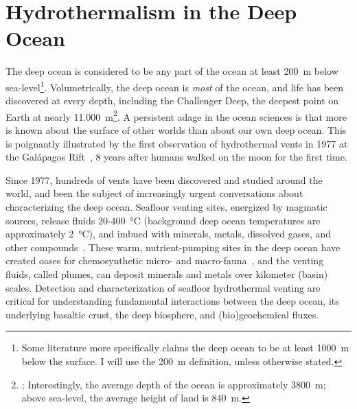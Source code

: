 \section{Hydrothermalism in the Deep Ocean}
\label{sec:charting-plumes}
The deep ocean is considered to be any part of the ocean at least \SI{200}{\meter} below sea-level\footnote{Some literature more specifically claims the deep ocean to be at least \SI{1000}{\meter} below the surface. I will use the \SI{200}{\meter} definition, unless otherwise stated.}.
Volumetrically, the deep ocean is \emph{most} of the ocean, and life has been discovered at every depth, including the Challenger Deep, the deepest point on Earth at nearly \SI{11,000}{\meter}\footnote{\autocite{cario2019exploring}; Interestingly, the average depth of the ocean is approximately \SI{3800}{\meter}; above sea-level, the average height of land is \SI{840}{\meter}.}.
A persistent adage in the ocean sciences is that more is known about the surface of other worlds than about our own deep ocean.
This is poignantly illustrated by the first observation of hydrothermal vents in 1977 at the Galápagos Rift~\autocite{corliss1979submarine}, 8 years after humans walked on the moon for the first time.

Since 1977, hundreds of vents have been discovered and studied around the world\autocite{beaulieu2013authoritative}, and been the subject of increasingly urgent conversations about characterizing the deep ocean.
Seafloor venting sites, energized by magmatic sources, release fluids 20-\SI{400}{\celsius} (background deep ocean temperatures are approximately \SI{2}{\celsius}), and imbued with minerals, metals, dissolved gases, and other compounds~\autocite{jannasch1985geomicrobiology, martin2008hydrothermal}.
These warm, nutrient-pumping sites in the deep ocean have created oases for chemosynthetic micro- and macro-fauna~\autocite{corliss1979submarine}, and the venting fluids, called plumes, can deposit minerals and metals over kilometer (basin) scales\autocite{scholz2019shelf,resing2015basin,le2019hydrothermal}.
Detection and characterization of seafloor hydrothermal venting are critical for understanding fundamental interactions between the deep ocean, its underlying basaltic crust, the deep biosphere, and (bio)geochemical fluxes.

